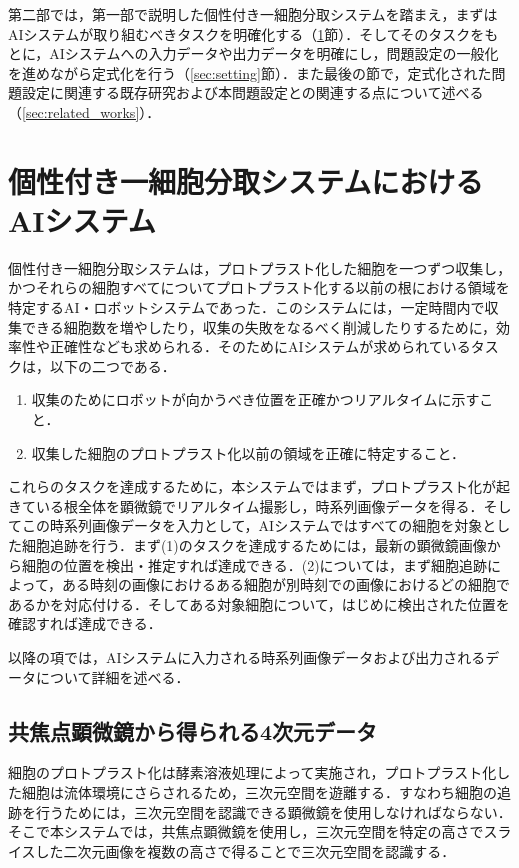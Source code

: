 \thispagestyle{fancy2}

第二部では，第一部で説明した個性付き一細胞分取システムを踏まえ，まずはAIシステムが取り組むべきタスクを明確化する（\ref{sec:ai_system}節）．そしてそのタスクをもとに，AIシステムへの入力データや出力データを明確にし，問題設定の一般化を進めながら定式化を行う（\ref{sec:setting}節）．また最後の節で，定式化された問題設定に関連する既存研究および本問題設定との関連する点について述べる（\ref{sec:related_works}）．

\section{個性付き一細胞分取システムにおけるAIシステム}

\label{sec:ai_system}
個性付き一細胞分取システムは，プロトプラスト化した細胞を一つずつ収集し，かつそれらの細胞すべてについてプロトプラスト化する以前の根における領域を特定するAI・ロボットシステムであった．このシステムには，一定時間内で収集できる細胞数を増やしたり，収集の失敗をなるべく削減したりするために，効率性や正確性なども求められる．そのためにAIシステムが求められているタスクは，以下の二つである．
\begin{enumerate}[label=(\arabic*)]
    \item 収集のためにロボットが向かうべき位置を正確かつリアルタイムに示すこと．
    \item 収集した細胞のプロトプラスト化以前の領域を正確に特定すること．
\end{enumerate}

これらのタスクを達成するために，本システムではまず，プロトプラスト化が起きている根全体を顕微鏡でリアルタイム撮影し，時系列画像データを得る．そしてこの時系列画像データを入力として，AIシステムではすべての細胞を対象とした細胞追跡を行う．まず(1)のタスクを達成するためには，最新の顕微鏡画像から細胞の位置を検出・推定すれば達成できる．(2)については，まず細胞追跡によって，ある時刻の画像におけるある細胞が別時刻での画像におけるどの細胞であるかを対応付ける．そしてある対象細胞について，はじめに検出された位置を確認すれば達成できる．

以降の項では，AIシステムに入力される時系列画像データおよび出力されるデータについて詳細を述べる．

    \subsection{共焦点顕微鏡から得られる4次元データ}

    細胞のプロトプラスト化は酵素溶液処理によって実施され，プロトプラスト化した細胞は流体環境にさらされるため，三次元空間を遊離する．すなわち細胞の追跡を行うためには，三次元空間を認識できる顕微鏡を使用しなければならない．そこで本システムでは，共焦点顕微鏡\cite{paddock2000principles}を使用し，三次元空間を特定の高さでスライスした二次元画像を複数の高さで得ることで三次元空間を認識する．

